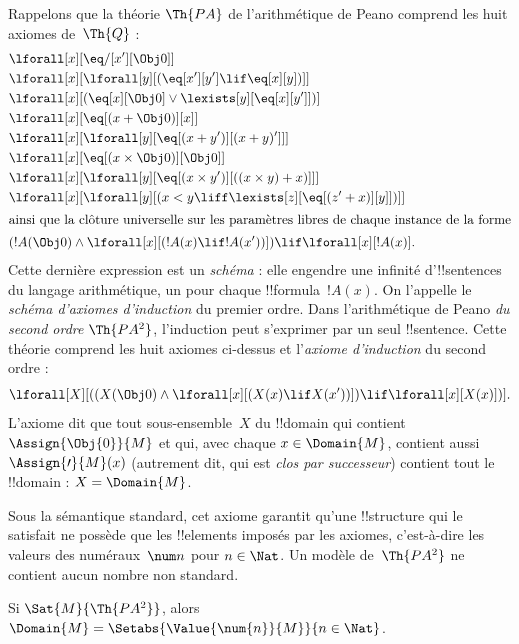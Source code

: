 \documentclass[../../../include/open-logic-section]{subfiles}
\begin{document}


Rappelons que la théorie $\Th{PA}$ de l'arithmétique
de Peano comprend les huit axiomes de~$\Th{Q}$ :
\begin{align*}
& \lforall[x][\eq/[x'][\Obj 0]]\\
& \lforall[x][\lforall[y][(\eq[x'][y'] \lif \eq[x][y])]]\\
& \lforall[x][(\eq[x][\Obj 0] \lor \lexists[y][\eq[x][y']])]\\
& \lforall[x][\eq[(x + \Obj 0)][x]]\\
& \lforall[x][\lforall[y][\eq[(x + y')][(x + y)']]]\\
& \lforall[x][\eq[(x \times \Obj 0)][\Obj 0]]\\
& \lforall[x][\lforall[y][\eq[(x \times y')][((x \times y) + x)]]]\\
& \lforall[x][\lforall[y][(x < y \liff \lexists[z][\eq[(z' + x)][y]])]]\\
\intertext{ainsi que la clôture universelle sur les paramètres libres de chaque instance de la forme}
& (!A(\Obj 0) \land \lforall[x][(!A(x) \lif !A(x'))]) \lif \lforall[x][!A(x)].
\end{align*}
Cette dernière expression est un \emph{schéma} :
elle engendre une infinité d'!!{sentence}s du
langage arithmétique, un pour chaque
!!{formula}~$!A(x)$. On l'appelle le
\emph{schéma d'axiomes d'induction} du premier
ordre.
Dans l'arithmétique de Peano \emph{du second ordre}
$\Th{PA^2}$, l'induction peut s'exprimer par
un seul !!{sentence}. Cette théorie comprend
les huit axiomes ci-dessus et l'\emph{axiome
d'induction} du second ordre :
\[
\lforall[X][((X(\Obj 0) \land \lforall[x][(X(x) \lif X(x'))]) \lif \lforall[x][X(x)])].
\]
L'axiome dit que tout sous-ensemble~$X$ du
!!{domain} qui contient $\Assign{\Obj{0}}{M}$
et qui, avec chaque $x\in\Domain{M}$,
contient aussi $\Assign{\prime}{M}(x)$
(autrement dit, qui est \emph{clos par successeur})
contient tout le !!{domain} : $X=\Domain{M}$.

Sous la sémantique standard, cet axiome garantit
qu'une !!{structure} qui le satisfait ne possède
que les !!{element}s imposés par les axiomes,
c'est-à-dire les valeurs des numéraux~$\num n$
pour $n\in\Nat$. Un modèle de~$\Th{PA^2}$
ne contient aucun nombre non standard.

\begin{thm}
Si $\Sat{M}{\Th{PA^2}}$, alors
$\Domain{M}=\Setabs{\Value{\num{n}}{M}}{n\in\Nat}$.
\end{thm}
\end{document}
